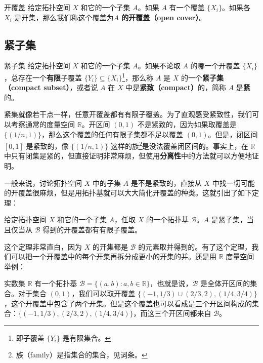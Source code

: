 \begin{definition}{开覆盖}
给定拓扑空间 $X$ 和它的一个子集 $A$。如果 $A$ 有一个覆盖 $\{X_i\}$。如果各 $X_i$ 是开集，那么我们称这个覆盖为\textbf{$A$ 的开覆盖（open cover）}。
\end{definition}

\subsection{紧子集}


\begin{definition}{紧子集}\label{def_Topo2_1}
给定拓扑空间 $X$ 和它的一个子集 $A$。如果不论取 $A$ 的哪一个开覆盖 $\{X_i\}$，总存在一个\textbf{有限}子覆盖 $\{Y_i\}\subseteq \{X_i\}$\footnote{即子覆盖 $\{Y_i\}$ 是有限集合。}，那么称 $A$ 是 $X$ 的一个\textbf{紧子集（compact subset）}，或者说 $A$ 在 $X$ 中是\textbf{紧致（compact）}的，简称 $A$ 是\textbf{紧}的。
\end{definition}

紧集就像若干点一样，任意开覆盖都有有限子覆盖。为了直观感受紧致性，我们可以考察通常的度量空间 $\mathbb{R}$。开区间 $(0,1)$ 不是紧致的，因为如果取覆盖是 $\{(1/n, 1)\}$，那么这个覆盖的任何有限子集都不足以覆盖 $(0, 1)$。但是，闭区间 $[0,1]$ 是紧致的，像 $\{(1/n, 1)\}$ 这样的族\footnote{族（family）是指集合的集合，见词条。}是没法覆盖闭区间的。事实上，在 $\mathbb{R}$ 中只有闭集是紧的，但直接证明非常麻烦，但使用\textbf{分离性}中的方法就可以方便地证明。

一般来说，讨论拓扑空间 $X$ 中的子集 $A$ 是不是紧致的，直接从 $X$ 中找一切可能的开覆盖很麻烦，但是用拓扑基就可以大大简化开覆盖的种类。这就引出了如下定理：

\begin{theorem}{}\label{the_Topo2_1}
给定拓扑空间 $X$ 和它的一个子集 $A$，任取 $X$ 的一个拓扑基 $\mathcal{B}$。$A$ 是紧子集，当且仅当从 $\mathcal{B}$ 得到的开覆盖都有有限子覆盖。
\end{theorem}

这个定理非常直白，因为 $X$ 的开集都是 $\mathcal{B}$ 的元素取并得到的。有了这个定理，我们可以把一个开覆盖中的每个开集再拆分成更小的开集的并。还是用 $\mathbb{R}$ 度量空间举例：

\begin{example}{}\label{ex_Topo2_1}
实数集 $\mathbb{R}$ 有一个拓扑基 $\mathcal{B}=\{(a,b):a,b\in \mathbb{R}\}$，也就是说，$\mathcal{B}$ 是全体开区间的集合。对于集合 $(0,1)$，我们可以取开覆盖 $\{(-1,1/3)\cup(2/3,2), (1/4, 3/4)\}$，这个开覆盖中包含了两个开集。但是这个覆盖也可以看成是三个开区间构成的集合：$\{(-1,1/3), (2/3,2), (1/4, 3/4)\}$，而这三个开区间都来自 $\mathcal{B}$。

\end{example}

